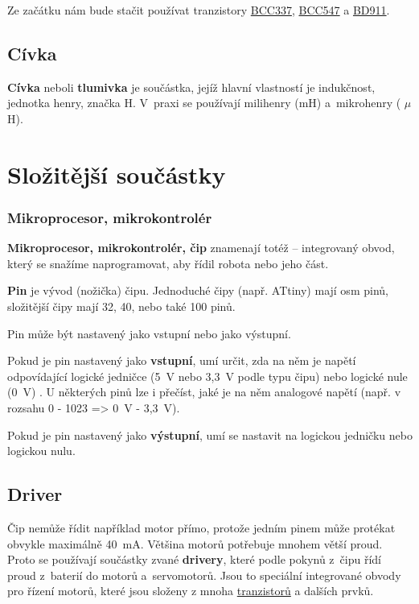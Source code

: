 Ze začátku nám bude stačit používat tranzistory 
\hyperlink{BCC337}{BCC337}, 
\hyperlink{BCC547}{BCC547} a
\hyperlink{BD911}{BD911}. 


\subsection{Cívka}

{\bf Cívka} neboli {\bf tlumivka} je součástka, 
jejíž hlavní vlastností je indukčnost, jednotka henry, značka H.
 V~praxi se používají milihenry (mH) a~mikrohenry ( $\mu$H).

\section{Složitější součástky}

\subsubsection{Mikroprocesor, mikrokontrolér} 

{\bf Mikroprocesor, mikrokontrolér, čip}    
znamenají totéž -- integrovaný obvod, který se snažíme naprogramovat, aby řídil robota nebo jeho část. \label{cip}

{\bf Pin}  \label{pin} je vývod (nožička) čipu. Jednoduché čipy (např. ATtiny) mají osm pinů, složitější čipy mají 32, 40, nebo také 100 pinů.

Pin může být nastavený jako vstupní nebo jako výstupní. 

Pokud je pin nastavený jako {\bf vstupní}, umí určit, zda na něm je napětí odpovídající logické jedničce (5~V nebo 3,3~V podle typu čipu) nebo logické nule (0~V) . 
U některých pinů lze i přečíst, jaké je na něm analogové napětí (např. v rozsahu 0 - 1023 => 0~V - 3,3~V). 

Pokud je pin nastavený jako {\bf výstupní},  umí se nastavit na logickou jedničku nebo logickou nulu. 

\subsection{Driver} \label{driver}

Čip nemůže řídit například motor přímo, protože jedním pinem může protékat obvykle maximálně 40~mA. 
Většina motorů potřebuje mnohem větší proud.
 Proto se používají součástky zvané {\bf drivery}, které podle pokynů z~čipu řídí proud z~baterií do motorů a~servomotorů. 
 Jsou to speciální integrované obvody pro řízení motorů, které jsou složeny z mnoha \hyperref[tranzistor]{tranzistorů} a dalších prvků. 
 
